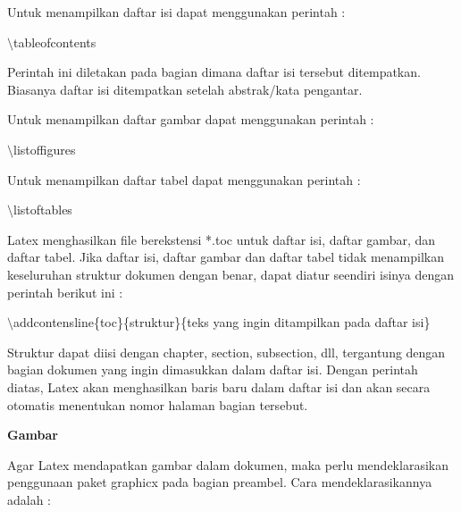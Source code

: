 Untuk menampilkan daftar isi dapat menggunakan perintah :\par \vspace{12pt}

$\setminus$tableofcontents\par \vspace{12pt}

Perintah ini diletakan pada bagian dimana daftar isi tersebut 
ditempatkan. Biasanya daftar isi ditempatkan setelah abstrak/kata pengantar.

Untuk menampilkan daftar gambar dapat menggunakan perintah :\par \vspace{12pt}

$\setminus$listoffigures\par \vspace{12pt}

Untuk menampilkan daftar tabel dapat menggunakan perintah :\par \vspace{12pt}

$\setminus$listoftables
\par \vspace{12pt}
Latex menghasilkan file berekstensi *.toc untuk daftar isi, daftar gambar, dan daftar tabel. Jika daftar isi, daftar gambar dan daftar tabel tidak menampilkan keseluruhan struktur dokumen dengan benar, dapat diatur seendiri isinya dengan perintah berikut ini :\par \vspace{12pt}

$\setminus$addcontensline\{toc\}\{struktur\}\{teks yang ingin 
ditampilkan pada daftar isi\}\par \vspace{12pt}

Struktur dapat diisi dengan chapter, section, subsection, dll, 
tergantung dengan bagian dokumen yang ingin dimasukkan dalam daftar isi. Dengan perintah diatas, Latex akan menghasilkan baris baru dalam daftar isi dan akan secara otomatis menentukan nomor halaman bagian tersebut.\par \vspace{12pt}

\textbf{Gambar}\par \vspace{12pt}

Agar Latex mendapatkan gambar dalam dokumen, maka perlu mendeklarasikan penggunaan paket graphicx pada bagian preambel. Cara mendeklarasikannya adalah :\par \vspace{12pt}

